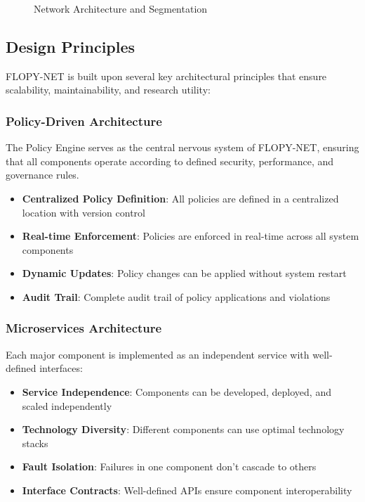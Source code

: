 \begin{figure}[H]
\caption{Network Architecture and Segmentation}
\label{fig:network-architecture}
\end{figure}

\subsection{Design Principles}

FLOPY-NET is built upon several key architectural principles that ensure scalability, maintainability, and research utility:

\subsubsection{Policy-Driven Architecture}

The Policy Engine serves as the central nervous system of FLOPY-NET, ensuring that all components operate according to defined security, performance, and governance rules.

\begin{itemize}
    \item \textbf{Centralized Policy Definition}: All policies are defined in a centralized location with version control
    \item \textbf{Real-time Enforcement}: Policies are enforced in real-time across all system components
    \item \textbf{Dynamic Updates}: Policy changes can be applied without system restart
    \item \textbf{Audit Trail}: Complete audit trail of policy applications and violations
\end{itemize}

\subsubsection{Microservices Architecture}

Each major component is implemented as an independent service with well-defined interfaces:

\begin{itemize}
    \item \textbf{Service Independence}: Components can be developed, deployed, and scaled independently
    \item \textbf{Technology Diversity}: Different components can use optimal technology stacks
    \item \textbf{Fault Isolation}: Failures in one component don't cascade to others
    \item \textbf{Interface Contracts}: Well-defined APIs ensure component interoperability
\end{itemize}

